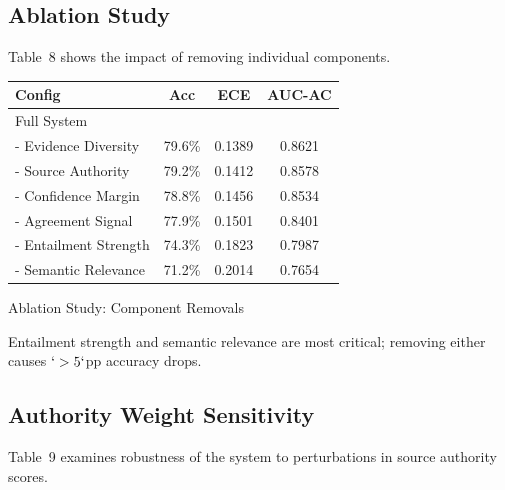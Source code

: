 \subsection{Ablation Study}\label{ablation-study}

Table~8 shows the impact of removing individual components.

\protect{}\label{tab:ablation}
{\def\LTcaptype{none} %
\begin{longtable}[]{@{}lccc@{}}
\toprule\noalign{}
\textbf{Config} & \textbf{Acc} & \textbf{ECE} & \textbf{AUC-AC} \\
\midrule\noalign{}
\endhead
\bottomrule\noalign{}
\endlastfoot
Full System & & & \\
- Evidence Diversity & 79.6\% & 0.1389 & 0.8621 \\
- Source Authority & 79.2\% & 0.1412 & 0.8578 \\
- Confidence Margin & 78.8\% & 0.1456 & 0.8534 \\
- Agreement Signal & 77.9\% & 0.1501 & 0.8401 \\
- Entailment Strength & 74.3\% & 0.1823 & 0.7987 \\
- Semantic Relevance & 71.2\% & 0.2014 & 0.7654 \\
\end{longtable}
}

Ablation Study: Component Removals

Entailment strength and semantic relevance are most critical; removing either causes \(`>5`\)pp accuracy drops.

\subsection{Authority Weight Sensitivity}\label{authority-weight-sensitivity}

Table~9 examines robustness of the system to perturbations in source authority scores.

